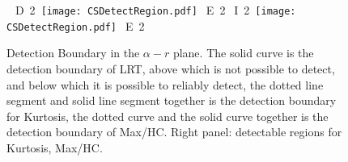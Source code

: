 \begin{figure}[htb]
\centerline{
\hbox{
D 2
\texttt{[image: CSDetectRegion.pdf]}
E 2
I 2
\texttt{[image: CSDetectRegion.pdf]}%
E 2
 }}
\caption{Detection Boundary in the $\alpha-r$ plane. The solid curve is the detection boundary of LRT, above which is not possible to detect, 
and below which it is possible to reliably detect, the dotted line segment and solid line segment together is the detection boundary for Kurtosis, 
the dotted curve and the solid curve together is the detection boundary of Max/HC. Right panel: detectable regions for Kurtosis, Max/HC.}
\label{Figure:Detect}
\end{figure}

